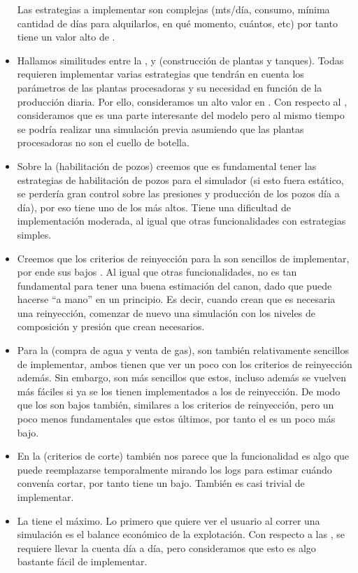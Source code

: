 \begin{itemize}
	Las estrategias a implementar son complejas (mts/día, consumo, mínima cantidad de días para alquilarlos, en qué momento, cuántos, etc) por tanto tiene un valor alto de \SP{}.

	\item Hallamos similitudes entre la ,  y  (construcción de plantas y tanques). Todas requieren implementar varias estrategias que tendrán en cuenta los parámetros de las plantas procesadoras y su necesidad en función de la producción diaria. Por ello, consideramos un alto valor en \SP{}. Con respecto al \BV{}, consideramos que es una parte interesante del modelo pero al mismo tiempo se podría realizar una simulación previa asumiendo que las plantas procesadoras no son el cuello de botella.

  \item Sobre la  (habilitación de pozos) creemos que es fundamental tener las estrategias de habilitación de pozos para el simulador (si esto fuera estático, se perdería gran control sobre las presiones y producción de los pozos día a día), por eso tiene uno de los \BV{} más altos. Tiene una dificultad de implementación moderada, al igual que otras funcionalidades con estrategias simples.

  \item Creemos que los criterios de reinyección para la  son sencillos de implementar, por ende sus bajos \SP{}. Al igual que otras funcionalidades, no es tan fundamental para tener una buena estimación del canon, dado que puede hacerse ``a mano'' en un principio. Es decir, cuando crean que es necesaria una reinyección, comenzar de nuevo una simulación con los niveles de composición y presión que crean necesarios.

  \item Para la  (compra de agua y venta de gas), son también relativamente sencillos de implementar, ambos tienen que ver un poco con los criterios de reinyección además. Sin embargo, son más sencillos que estos, incluso además se vuelven más fáciles si ya se los tienen implementados a los de reinyección. De modo que los \SP{} son bajos también, similares a los criterios de reinyección, pero un poco menos fundamentales que estos últimos, por tanto el \BV{} es un poco más bajo. 

  \item En la  (criterios de corte) también nos parece que la funcionalidad es algo que puede reemplazarse temporalmente mirando los logs para estimar cuándo convenía cortar, por tanto tiene un \BV{} bajo. También es casi trivial de implementar.

  \item La  tiene el \BV{} máximo. Lo primero que quiere ver el usuario al correr una simulación es el balance económico de la explotación. Con respecto a las \SP{}, se requiere llevar la cuenta día a día, pero consideramos que esto es algo bastante fácil de implementar.
\end{itemize}


